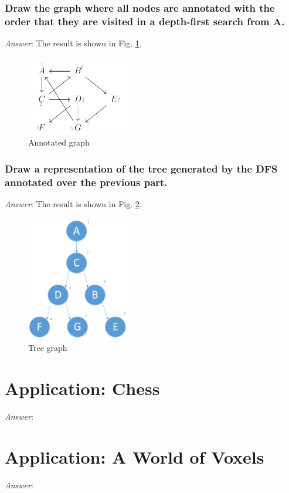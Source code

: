 \documentclass[11pt]{article}
\begin{document}
\subsubsection{Draw the graph where all nodes are annotated with the order that they are visited in a \textbf{depth-first} search from A.}
\noindent \emph{Answer}: The result is shown in Fig. \ref{fig:fig2}.
	\begin{figure}[h]
		\centering
		\includegraphics[width=0.4\textwidth]{Figure/Fig3.png}
		\caption{Annotated graph}
		\label{fig:fig2}
	\end{figure}
\subsubsection{Draw a representation of the tree generated by the DFS annotated over the previous part.}
\noindent \emph{Answer}: The result is shown in Fig. \ref{fig:fig3}.
	\begin{figure}[h]
		\centering
		\includegraphics[width=0.4\textwidth]{Figure/Fig2.png}
		\caption{Tree graph}
		\label{fig:fig3}
	\end{figure}
\section{Application: Chess}
\noindent \emph{Answer}:
\section{Application: A World of Voxels}
\noindent \emph{Answer}:
\end{document}
